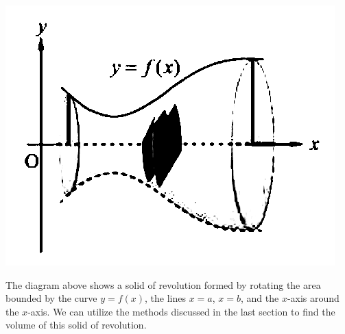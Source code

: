     \begin{center}
        \includegraphics[scale=0.3]{assets/28-22a.png}
    \end{center}

    The diagram above shows a solid of revolution formed by rotating the area
    bounded by the curve $y = f(x)$, the lines $x = a$, $x = b$, and the $x$-axis
    around the $x$-axis. We can utilize the methods discussed in the last section
    to find the volume of this solid of revolution.

